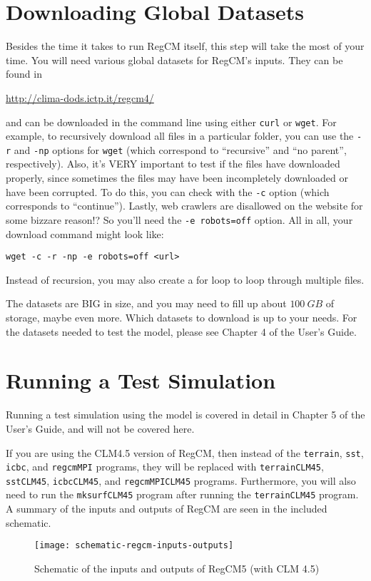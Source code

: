 \section{Downloading Global Datasets}
	Besides the time it takes to run RegCM itself, this step will take the most of your time.
	You will need various global datasets for RegCM's inputs.
	They can be found in
	\begin{center}
		\url{http://clima-dods.ictp.it/regcm4/}
	\end{center}
	and can be downloaded in the command line using either \texttt{curl} or \texttt{wget}.
	For example, to recursively download all files in a particular folder, you can use the \texttt{-r} and \texttt{-np} options for \texttt{wget} (which correspond to ``recursive'' and ``no parent'', respectively). 
	Also, it's VERY important to test if the files have downloaded properly, since sometimes the files may have been incompletely downloaded or have been corrupted.
	To do this, you can check with the \texttt{-c} option (which corresponds to ``continue'').
	Lastly, web crawlers are disallowed on the website for some bizzare reason!? So you'll need the \texttt{-e robots=off} option. 
	All in all, your download command might look like:
	\begin{center}
		\texttt{wget -c -r -np -e robots=off <url>}
	\end{center}
	Instead of recursion, you may also create a for loop to loop through multiple files.
	
	The datasets are BIG in size, and you may need to fill up about $\qty{100}{GB}$ of storage, maybe even more.
	Which datasets to download is up to your needs.
	For the datasets needed to test the model, please see Chapter 4 of the User's Guide.
	
\section{Running a Test Simulation}
	Running a test simulation using the model is covered in detail in Chapter 5 of the User's Guide, and will not be covered here.
	
	If you are using the CLM4.5 version of RegCM, then instead of the 
	\texttt{terrain}, \texttt{sst}, \texttt{icbc}, and \texttt{regcmMPI} programs,
	they will be replaced with 
	\texttt{terrainCLM45}, \texttt{sstCLM45}, \texttt{icbcCLM45}, and \texttt{regcmMPICLM45} programs.
	Furthermore, you will also need to run the \texttt{mksurfCLM45} program after running the \texttt{terrainCLM45} program.
	A summary of the inputs and outputs of RegCM are seen in the included schematic.
	\begin{figure}	
		\centering
		\texttt{[image: schematic-regcm-inputs-outputs]}
		\caption{
			Schematic of the inputs and outputs of RegCM5 (with CLM 4.5)
		}
	\end{figure}
	
